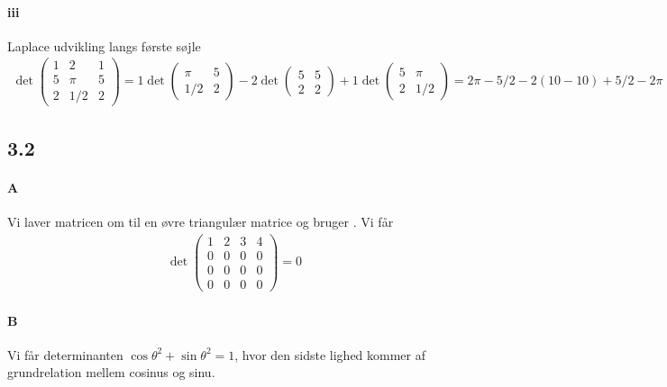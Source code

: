 			\paragraph{iii} Laplace udvikling langs første søjle
				\begin{align*}
					\det \left(\begin{array}{rrr}{1} & {2} & {1} \\ {5} & {\pi} & {5} \\ {2} & {1 / 2} & {2}\end{array}\right) = 1 \det \left(\begin{array}{rr} \pi & 5 \\ 1/2 & 2 \end{array}\right) -2 \det \left(\begin{array}{rr} 5 & 5 \\ 2 & 2 \end{array}\right) + 1 \det \left(\begin{array}{rr} 5 & \pi \\ 2 & 1/2 \end{array}\right)= 2\pi-5/2-2(10-10)+5/2-2\pi=0
				\end{align*}

		\subsection{3.2}

			\paragraph{A} Vi laver matricen om til en øvre triangulær matrice og bruger \cite[Sætning 3.3.3]{hesselholt2017}. Vi får
				\begin{align*}
					\det \left(\begin{array}{llll}{1} & {2} & {3} & {4} \\ {0} & {0} & {0} & {0} \\ {0} & {0} & {0} & {0} \\ {0} & {0} & {0} & {0}\end{array}\right) =0
				\end{align*}

			\paragraph{B} Vi får determinanten $\cos \theta ^2 + \sin \theta ^2 =1$, hvor den sidste lighed kommer af grundrelation mellem cosinus og sinu.

